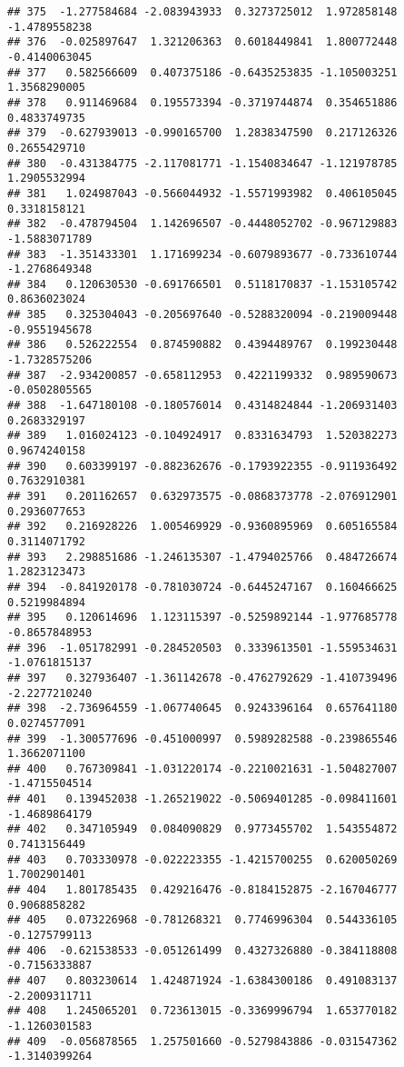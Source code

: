\documentclass[
]{article}
\begin{document}
\begin{verbatim}
## 375  -1.277584684 -2.083943933  0.3273725012  1.972858148 -1.4789558238
## 376  -0.025897647  1.321206363  0.6018449841  1.800772448 -0.4140063045
## 377   0.582566609  0.407375186 -0.6435253835 -1.105003251  1.3568290005
## 378   0.911469684  0.195573394 -0.3719744874  0.354651886  0.4833749735
## 379  -0.627939013 -0.990165700  1.2838347590  0.217126326  0.2655429710
## 380  -0.431384775 -2.117081771 -1.1540834647 -1.121978785  1.2905532994
## 381   1.024987043 -0.566044932 -1.5571993982  0.406105045  0.3318158121
## 382  -0.478794504  1.142696507 -0.4448052702 -0.967129883 -1.5883071789
## 383  -1.351433301  1.171699234 -0.6079893677 -0.733610744 -1.2768649348
## 384   0.120630530 -0.691766501  0.5118170837 -1.153105742  0.8636023024
## 385   0.325304043 -0.205697640 -0.5288320094 -0.219009448 -0.9551945678
## 386   0.526222554  0.874590882  0.4394489767  0.199230448 -1.7328575206
## 387  -2.934200857 -0.658112953  0.4221199332  0.989590673 -0.0502805565
## 388  -1.647180108 -0.180576014  0.4314824844 -1.206931403  0.2683329197
## 389   1.016024123 -0.104924917  0.8331634793  1.520382273  0.9674240158
## 390   0.603399197 -0.882362676 -0.1793922355 -0.911936492  0.7632910381
## 391   0.201162657  0.632973575 -0.0868373778 -2.076912901  0.2936077653
## 392   0.216928226  1.005469929 -0.9360895969  0.605165584  0.3114071792
## 393   2.298851686 -1.246135307 -1.4794025766  0.484726674  1.2823123473
## 394  -0.841920178 -0.781030724 -0.6445247167  0.160466625  0.5219984894
## 395   0.120614696  1.123115397 -0.5259892144 -1.977685778 -0.8657848953
## 396  -1.051782991 -0.284520503  0.3339613501 -1.559534631 -1.0761815137
## 397   0.327936407 -1.361142678 -0.4762792629 -1.410739496 -2.2277210240
## 398  -2.736964559 -1.067740645  0.9243396164  0.657641180  0.0274577091
## 399  -1.300577696 -0.451000997  0.5989282588 -0.239865546  1.3662071100
## 400   0.767309841 -1.031220174 -0.2210021631 -1.504827007 -1.4715504514
## 401   0.139452038 -1.265219022 -0.5069401285 -0.098411601 -1.4689864179
## 402   0.347105949  0.084090829  0.9773455702  1.543554872  0.7413156449
## 403   0.703330978 -0.022223355 -1.4215700255  0.620050269  1.7002901401
## 404   1.801785435  0.429216476 -0.8184152875 -2.167046777  0.9068858282
## 405   0.073226968 -0.781268321  0.7746996304  0.544336105 -0.1275799113
## 406  -0.621538533 -0.051261499  0.4327326880 -0.384118808 -0.7156333887
## 407   0.803230614  1.424871924 -1.6384300186  0.491083137 -2.2009311711
## 408   1.245065201  0.723613015 -0.3369996794  1.653770182 -1.1260301583
## 409  -0.056878565  1.257501660 -0.5279843886 -0.031547362 -1.3140399264

\end{verbatim}
\end{document}

